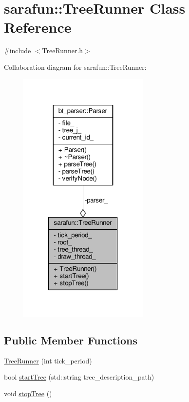 \hypertarget{classsarafun_1_1TreeRunner}{\section{sarafun\-:\-:Tree\-Runner Class Reference}
\label{classsarafun_1_1TreeRunner}
}


{\ttfamily \#include $<$Tree\-Runner.\-h$>$}



Collaboration diagram for sarafun\-:\-:Tree\-Runner\-:\nopagebreak
\begin{figure}[H]
\begin{center}
\leavevmode
\includegraphics[width=184pt]{de/d3b/classsarafun_1_1TreeRunner__coll__graph}
\end{center}
\end{figure}
\subsection*{Public Member Functions}
\begin{DoxyCompactItemize}
\item 
\hyperlink{classsarafun_1_1TreeRunner_a0db16bb58de51d41730e8ee71a0243e4_a0db16bb58de51d41730e8ee71a0243e4}{Tree\-Runner} (int tick\-\_\-period)
\item 
bool \hyperlink{classsarafun_1_1TreeRunner_ad89a0d33af669afeae2c299a1dfc1848_ad89a0d33af669afeae2c299a1dfc1848}{start\-Tree} (std\-::string tree\-\_\-description\-\_\-path)
\item 
void \hyperlink{classsarafun_1_1TreeRunner_a447a35fa7aba8eb30c80546bf2d4ccca_a447a35fa7aba8eb30c80546bf2d4ccca}{stop\-Tree} ()
\end{DoxyCompactItemize}
